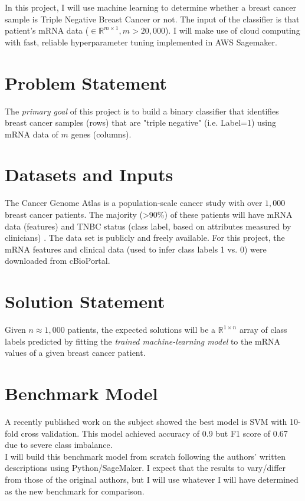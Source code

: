 \documentclass[11pt]{diazessay}
\begin{document}
In this project, I will use machine learning to determine whether a breast cancer sample is Triple Negative Breast Cancer or not. The input of the classifier is that patient's mRNA data ($\in \mathbb{R}^{m \times 1}, m > 20,000$).  I will make use of cloud computing with fast, reliable hyperparameter tuning implemented in AWS Sagemaker.

\section{Problem Statement}

The \textit{primary goal} of this project is to build a binary classifier that identifies breast cancer samples (rows) that are "triple negative" (i.e. Label=1) using mRNA data of $m$ genes (columns).

\section{Datasets and Inputs}

The Cancer Genome Atlas is a population-scale cancer study with  over $1,000$ breast cancer patients. The majority (>90\%) of these patients will have mRNA data (features) and TNBC status (class label, based on attributes measured by clinicians) \cite{tcga2012}. The data set is publicly and freely available. For this project, the mRNA features and clinical data (used to infer class labels 1 vs. 0)  were downloaded from cBioPortal.

\section{Solution Statement}

Given $n \approx 1,000$ patients, the expected solutions will be a $\mathbb{R}^{1 \times n}$ array of class labels predicted by fitting the \textit{trained machine-learning model} to the mRNA values of a given breast cancer patient.

\section{Benchmark Model}

A recently published work on the subject \cite{wu2021} showed the best model is SVM with 10-fold cross validation. This model achieved accuracy of 0.9 but F1 score of 0.67 due to severe class imbalance. \\

I will build this benchmark model from scratch following the authors' written descriptions using Python/SageMaker. I expect that the results to vary/differ from those of the original authors, but I will use whatever I will have determined as the new benchmark for comparison.
\end{document}
